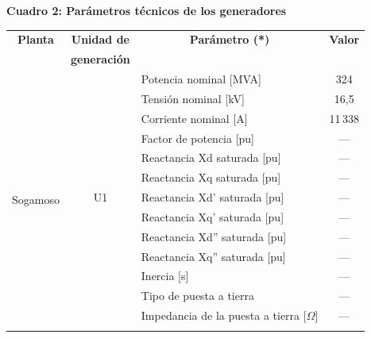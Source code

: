 \documentclass[12pt]{article}
\begin{document}
\begin{center}

\textbf{Cuadro 2: Parámetros técnicos de los generadores}

\vspace{2mm}

\scriptsize
\renewcommand{\arraystretch}{0.95}

\begin{tabular}{|c|c|p{6.0cm}|c|}
\hline

\textbf{Planta} &
\textbf{Unidad de} &
\multicolumn{1}{|c|}{\textbf{Parámetro (*)}} &
\textbf{Valor} \\

&
\textbf{generación} &
&
\\
\hline

\multirow{39}{*}{\centering Sogamoso}
&
\multirow{13}{*}{\centering U1}
& Potencia nominal [MVA] & 324 \\ \cline{3-4}
& & Tensión nominal [kV] & 16,5 \\ \cline{3-4}
& & Corriente nominal [A] & 11\,338 \\ \cline{3-4}
& & Factor de potencia [pu] & --- \\ \cline{3-4}
& & Reactancia Xd saturada [pu] & --- \\ \cline{3-4}
& & Reactancia Xq saturada [pu] & --- \\ \cline{3-4}
& & Reactancia Xd' saturada [pu] & --- \\ \cline{3-4}
& & Reactancia Xq' saturada [pu] & --- \\ \cline{3-4}
& & Reactancia Xd'' saturada [pu] & --- \\ \cline{3-4}
& & Reactancia Xq'' saturada [pu] & --- \\ \cline{3-4}
& & Inercia [s] & --- \\ \cline{3-4}
& & Tipo de puesta a tierra & --- \\ \cline{3-4}
& & Impedancia de la puesta a tierra [$\Omega$] & --- \\ \cline{2-4}


\end{tabular}
\end{center}
\end{document}

